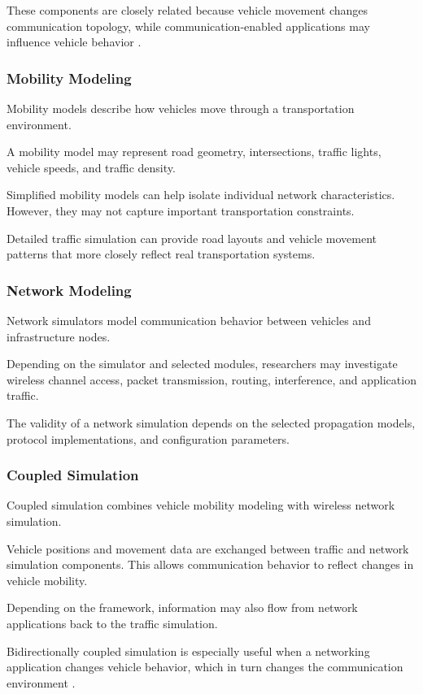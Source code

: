 These components are closely related
because vehicle movement changes
communication topology, while
communication-enabled applications
may influence vehicle behavior
\cite{Sommer2011}.

\subsubsection{Mobility Modeling}

Mobility models describe how vehicles
move through a transportation environment.

A mobility model may represent road
geometry, intersections, traffic lights,
vehicle speeds, and traffic density.

Simplified mobility models can help
isolate individual network
characteristics. However, they may
not capture important transportation
constraints.

Detailed traffic simulation can
provide road layouts and vehicle
movement patterns that more closely
reflect real transportation systems.

\subsubsection{Network Modeling}

Network simulators model communication
behavior between vehicles and
infrastructure nodes.

Depending on the simulator and selected
modules, researchers may investigate
wireless channel access, packet
transmission, routing, interference,
and application traffic.

The validity of a network simulation
depends on the selected propagation
models, protocol implementations,
and configuration parameters.

\subsubsection{Coupled Simulation}

Coupled simulation combines vehicle
mobility modeling with wireless
network simulation.

Vehicle positions and movement data
are exchanged between traffic and
network simulation components.
This allows communication behavior
to reflect changes in vehicle mobility.

Depending on the framework, information
may also flow from network applications
back to the traffic simulation.

Bidirectionally coupled simulation
is especially useful when a networking
application changes vehicle behavior,
which in turn changes the communication
environment \cite{Sommer2011}.

